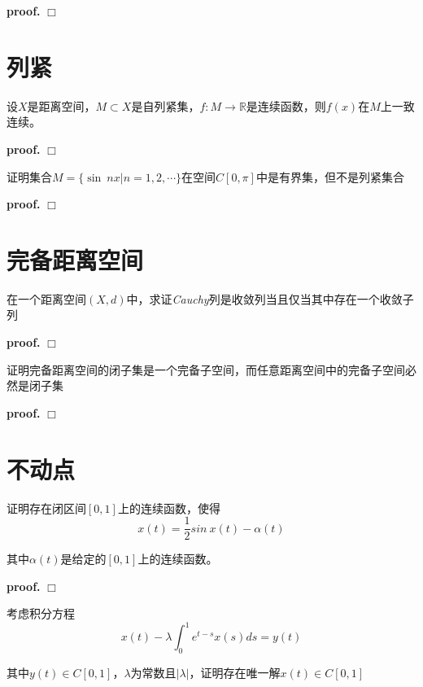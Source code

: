 \textbf{proof.} $\Box$

\section{列紧}

\begin{mdframed}
    \begin{question}
        设$X$是距离空间，$M\subset X$是自列紧集，$f:M\rightarrow \mathbb{R}$是连续函数，则$f(x)$在$M$上一致连续。
    \end{question}
\end{mdframed}

\textbf{proof.} $\Box$

\begin{mdframed}
    \begin{question}
        证明集合$M=\{\sin\ nx|n=1,2,\cdots\}$在空间$C[0,\pi]$中是有界集，但不是列紧集合
    \end{question}
\end{mdframed}

\textbf{proof.} $\Box$

\section{完备距离空间}

\begin{mdframed}
    \begin{question}
        在一个距离空间$(X,d)$中，求证\textsl{Cauchy}列是收敛列当且仅当其中存在一个收敛子列
    \end{question}
\end{mdframed}

\textbf{proof.} $\Box$

\begin{mdframed}
    \begin{question}
        证明完备距离空间的闭子集是一个完备子空间，而任意距离空间中的完备子空间必然是闭子集
    \end{question}
\end{mdframed}

\textbf{proof.} $\Box$

\section{不动点}

\begin{mdframed}
    \begin{question}
        证明存在闭区间$[0,1]$上的连续函数，使得
        \begin{equation}
            x(t)=\frac{1}{2}sin\ x(t)-\alpha(t)
        \end{equation}

        其中$\alpha(t)$是给定的$[0,1]$上的连续函数。
    \end{question}
\end{mdframed}

\textbf{proof.} $\Box$

\begin{mdframed}
    \begin{question}
        考虑积分方程
        \begin{equation}
            x(t)-\lambda\int_{0}^{1}e^{t-s}x(s)ds=y(t)
        \end{equation}

        其中$y(t)\in C[0,1]$，$\lambda$为常数且$|\lambda|$，证明存在唯一解$x(t)\in C[0,1]$
    \end{question}
\end{mdframed}